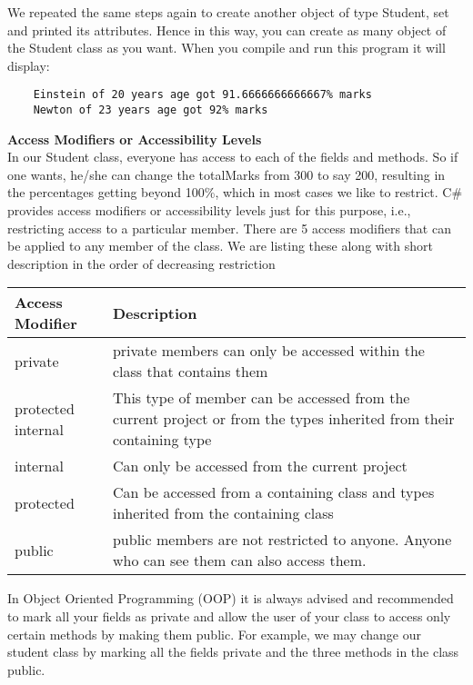 We repeated the same steps again to create another object of type Student, set and printed its attributes. Hence in
this way, you can create as many object of the Student class as you want. When you compile and run this program
it will display:

\begin{lstlisting}
    Einstein of 20 years age got 91.6666666666667% marks
    Newton of 23 years age got 92% marks
\end{lstlisting}

\textbf{Access Modifiers or Accessibility Levels}\\

In our Student class, everyone has access to each of the fields and methods. So if one wants, he/she can change the
totalMarks from 300 to say 200, resulting in the percentages getting beyond 100\%, which in most cases we like to
restrict. C\# provides access modifiers or accessibility levels just for this purpose, i.e., restricting access to a
particular member. There are 5 access modifiers that can be applied to any member of the class. We are listing
these along with short description in the order of decreasing restriction

\begin{center}
    \begin{tabular}{ | m{5em} | m{10cm} | } 
    \hline
    Access Modifier & Description \\
    \hline
    private & private members can only be accessed within the class that contains them\\
    protected internal & This type of member can be accessed from the current project or from the types inherited
    from their containing type\\
    internal & Can only be accessed from the current project\\
    protected & Can be accessed from a containing class and types inherited from the containing class\\
    public & public members are not restricted to anyone. Anyone who can see them can also access
    them.\\
    \hline
    \end{tabular}
\end{center}
 

In Object Oriented Programming (OOP) it is always advised and recommended to mark all your fields as private
and allow the user of your class to access only certain methods by making them public. For example, we may
change our student class by marking all the fields private and the three methods in the class public.

